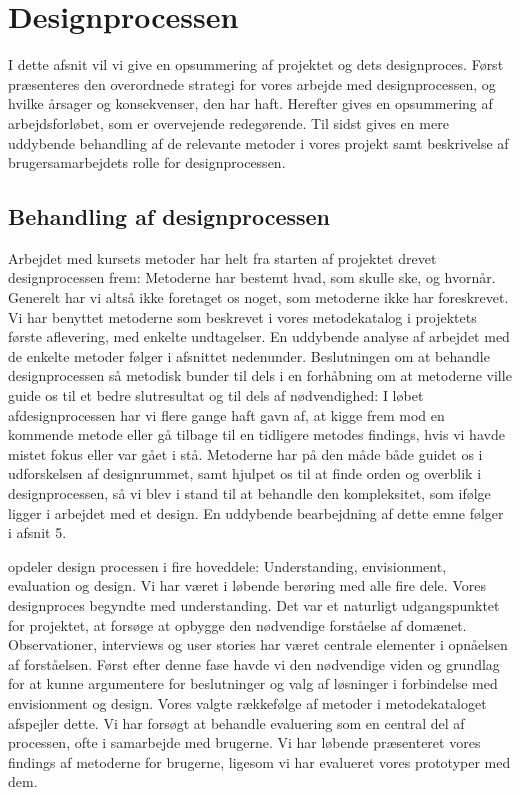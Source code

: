 \chapter{Designprocessen}
I dette afsnit vil vi give en opsummering af projektet og dets designproces.
Først præsenteres den overordnede strategi for vores arbejde med designprocessen, og hvilke årsager og konsekvenser, den har haft.
Herefter gives en opsummering af arbejdsforløbet, som er overvejende redegørende. 
Til sidst gives en mere uddybende behandling af de relevante metoder i vores projekt samt beskrivelse af brugersamarbejdets rolle for designprocessen.

\section{Behandling af designprocessen}
Arbejdet med kursets metoder har helt fra starten af projektet drevet designprocessen frem: Metoderne har bestemt hvad, som skulle ske, og hvornår. Generelt har vi altså ikke foretaget os noget, som metoderne ikke har foreskrevet. Vi har benyttet metoderne som beskrevet i vores metodekatalog i projektets første aflevering, med enkelte undtagelser. En uddybende analyse af arbejdet med de enkelte metoder følger i afsnittet nedenunder.
Beslutningen om at behandle designprocessen så metodisk bunder til dels i en forhåbning om at metoderne ville guide os til et bedre slutresultat og til dels af nødvendighed: I løbet afdesignprocessen har vi flere gange haft gavn af, at kigge frem mod en kommende metode eller gå tilbage til en tidligere metodes findings, hvis vi havde mistet fokus eller var gået i stå. 
Metoderne har på den måde både guidet os i udforskelsen af designrummet, samt hjulpet os til at finde orden og overblik i designprocessen, så vi blev i stand til at behandle den kompleksitet, som ifølge \citep{Stolterman} ligger i arbejdet med et design. En uddybende bearbejdning af dette emne følger i afsnit 5.

\citep{Benyon} opdeler design processen i fire hoveddele: Understanding, envisionment, evaluation og design. Vi har været i løbende berøring med alle fire dele. 
Vores designproces begyndte med understanding. Det var et naturligt udgangspunktet for projektet, at forsøge at opbygge den nødvendige forståelse af domænet. Observationer, interviews og user stories har været centrale elementer i opnåelsen af forståelsen. Først efter denne fase havde vi den nødvendige viden og grundlag for at kunne argumentere for beslutninger og valg af løsninger i forbindelse med envisionment og design. Vores valgte rækkefølge af metoder i metodekataloget afspejler dette.
Vi har forsøgt at behandle evaluering som en central del af processen, ofte i samarbejde med brugerne. Vi har løbende præsenteret vores findings af metoderne for brugerne, ligesom vi har evalueret vores prototyper med dem.

